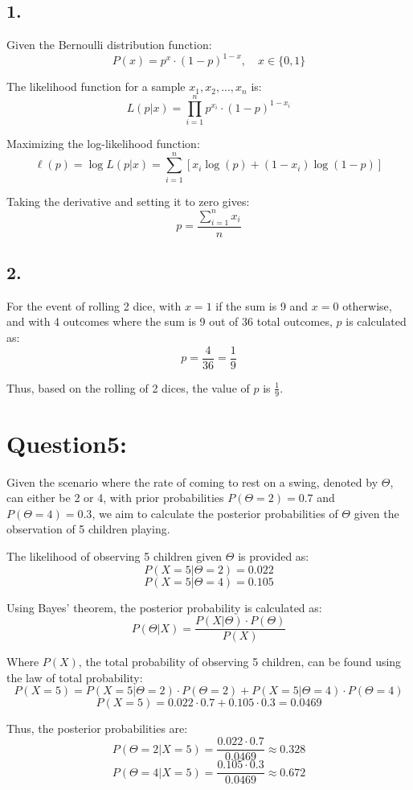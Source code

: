 \documentclass{article}
\begin{document}
\subsection*{1.}
Given the Bernoulli distribution function:
\[ P(x) = p^x \cdot (1 - p)^{1-x}, \quad x \in \{0, 1\} \]

The likelihood function for a sample \(x_1, x_2, ..., x_n\) is:
\[ L(p|x) = \prod_{i=1}^{n} p^{x_i} \cdot (1 - p)^{1-x_i} \]

Maximizing the log-likelihood function:
\[ \ell(p) = \log L(p|x) = \sum_{i=1}^{n} \left[ x_i \log(p) + (1 - x_i) \log(1 - p) \right] \]

Taking the derivative and setting it to zero gives:
\[ p = \frac{\sum_{i=1}^{n} x_i}{n} \]

\subsection*{2.}

For the event of rolling 2 dice, with \(x = 1\) if the sum is 9 and \(x = 0\) otherwise, and with 4 outcomes where the sum is 9 out of 36 total outcomes, \(p\) is calculated as:
\[ p = \frac{4}{36} = \frac{1}{9} \]

Thus, based on the rolling of 2 dices, the value of \(p\) is \(\frac{1}{9}\).

\section*{Question5:}
Given the scenario where the rate of coming to rest on a swing, denoted by $\Theta$, can either be 2 or 4, with prior probabilities $P(\Theta = 2) = 0.7$ and $P(\Theta = 4) = 0.3$, we aim to calculate the posterior probabilities of $\Theta$ given the observation of 5 children playing.

The likelihood of observing 5 children given $\Theta$ is provided as:
\[ P(X = 5 | \Theta = 2) = 0.022 \]
\[ P(X = 5 | \Theta = 4) = 0.105 \]

Using Bayes' theorem, the posterior probability is calculated as:
\[ P(\Theta | X) = \frac{P(X | \Theta) \cdot P(\Theta)}{P(X)} \]

Where $P(X)$, the total probability of observing 5 children, can be found using the law of total probability:
\[ P(X = 5) = P(X = 5 | \Theta = 2) \cdot P(\Theta = 2) + P(X = 5 | \Theta = 4) \cdot P(\Theta = 4) \]
\[ P(X = 5) = 0.022 \cdot 0.7 + 0.105 \cdot 0.3 = 0.0469 \]

Thus, the posterior probabilities are:
\[ P(\Theta = 2 | X = 5) = \frac{0.022 \cdot 0.7}{0.0469} \approx 0.328 \]
\[ P(\Theta = 4 | X = 5) = \frac{0.105 \cdot 0.3}{0.0469} \approx 0.672 \]
\end{document}
